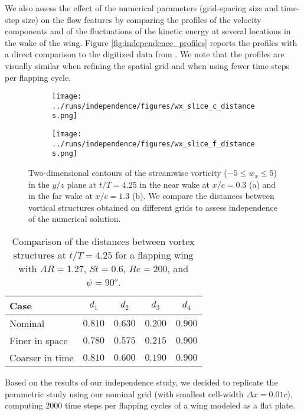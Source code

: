 We also assess the effect of the numerical parameters (grid-spacing size and time-step size) on the flow features by comparing the profiles of the velocity components and of the fluctuations of the kinetic energy at several locations in the wake of the wing.
Figure \ref{fig:independence_profiles} reports the profiles with a direct comparison to the digitized data from \citet{li_dong_2016}.
We note that the profiles are visually similar when refining the spatial grid and when using fewer time steps per flapping cycle.

\begin{figure}
  \centering
  \begin{subfigure}[c]{0.45\textwidth}
    \centering
    \texttt{[image: ../runs/independence/figures/wx\_slice\_c\_distances.png]}
    \caption{}
  \end{subfigure}
  \hfill
  \begin{subfigure}[c]{0.45\textwidth}
    \centering
    \texttt{[image: ../runs/independence/figures/wx\_slice\_f\_distances.png]}
    \caption{}
  \end{subfigure}
  \caption{Two-dimensional contours of the streamwise vorticity ($-5 \leq w_x \leq 5$) in the $y/z$ plane at $t/T = 4.25$ in the near wake at $x / c = 0.3$ (a) and in the far wake at $x / c = 1.3$ (b). We compare the distances between vortical structures obtained on different grids to assess independence of the numerical solution.}
  \label{fig:independence_wx_distances}
\end{figure}

\begin{table}
  \centering
  \begin{tabular}{lcccc}
    \hline\hline
    Case & $d_1$ & $d_2$ & $d_3$ & $d_4$ \\
    \hline
    Nominal & $0.810$ & $0.630$ & $0.200$ & $0.900$ \\
    Finer in space & $0.780$ & $0.575$ & $0.215$ & $0.900$ \\
    Coarser in time & $0.810$ & $0.600$ & $0.190$ & $0.900$ \\
    \hline\hline
  \end{tabular}
  \caption{Comparison of the distances between vortex structures at $t / T = 4.25$ for a flapping wing with $AR = 1.27$, $St = 0.6$, $Re = 200$, and $\psi = 90^o$.}
  \label{tab:independence_wx_distances}
\end{table}

Based on the results of our independence study, we decided to replicate the parametric study using our nominal grid (with smallest cell-width $\Delta x = 0.01c$), computing $2000$ time steps per flapping cycles of a wing modeled as a flat plate.

